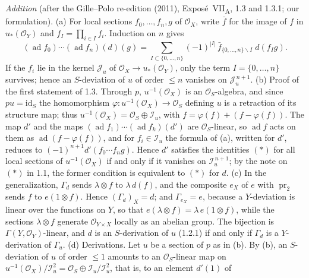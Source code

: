 \par\medskip\noindent{}%
\emph{Addition} (after the Gille--Polo re-edition (2011),
Expos\'e~VII\textsubscript{A}, 1.3 and 1.3.1; our formulation).
(a) For local sections \(f_0,\ldots,f_n,g\) of \(\mathcal O_X\), write
\(\bar f\) for the image of \(f\) in \(u_*(\mathcal O_Y)\) and
\(f_I=\prod_{i\in I}f_i\). Induction on \(n\) gives
\[
  (\operatorname{ad}f_0)\cdots(\operatorname{ad}f_n)(d)(g)
  =\sum_{I\subset\{0,\ldots,n\}}(-1)^{|I|}\,
   \bar f_{\{0,\ldots,n\}\smallsetminus I}\;d(f_Ig).
\]
If the \(f_i\) lie in the kernel \(\mathcal J_u\) of
\(\mathcal O_X\to u_*(\mathcal O_Y)\), only the term
\(I=\{0,\ldots,n\}\) survives; hence an \(S\)-deviation of \(u\) of
order \(\leq n\) vanishes on \(\mathcal J_u^{\,n+1}\).
(b) Proof of the first statement of 1.3. Through \(p\),
\(u^{-1}(\mathcal O_X)\) is an \(\mathcal O_S\)-algebra, and since
\(pu=\mathrm{id}_S\) the homomorphism
\(\varphi:u^{-1}(\mathcal O_X)\to\mathcal O_S\) defining \(u\) is a
retraction of its structure map; thus
\(u^{-1}(\mathcal O_X)=\mathcal O_S\oplus\mathcal I_u\), with
\(f=\varphi(f)+(f-\varphi(f))\). The map \(d'\) and the maps
\((\operatorname{ad}f_1)\cdots(\operatorname{ad}f_k)(d')\) are
\(\mathcal O_S\)-linear, so \(\operatorname{ad}f\) acts on them as
\(\operatorname{ad}(f-\varphi(f))\), and for \(f_i\in\mathcal I_u\) the
formula of (a), written for \(d'\), reduces to
\((-1)^{n+1}d'(f_0\cdots f_ng)\). Hence \(d'\) satisfies the identities
\((\ast)\) for all local sections of \(u^{-1}(\mathcal O_X)\) if and only
if it vanishes on \(\mathcal I_u^{\,n+1}\); by the note on \((\ast)\)
in 1.1, the former condition is equivalent to \((\ast)\) for \(d\).
(c) In the generalization, \(\Gamma_d\) sends \(\lambda\otimes f\) to
\(\lambda\,d(f)\), and the composite \(e_X\) of \(e\) with
\(\operatorname{pr}_2\) sends \(f\) to \(e(1\otimes f)\). Hence
\((\Gamma_d)_X=d\); and \(\Gamma_{e_X}=e\), because a \(Y\)-deviation is
linear over the functions on \(Y\), so that
\(e(\lambda\otimes f)=\lambda\,e(1\otimes f)\), while the sections
\(\lambda\otimes f\) generate \(\mathcal O_{Y\times X}\) locally as an
abelian group. The bijection is \(\Gamma(Y,\mathcal O_Y)\)-linear, and
\(d\) is an \(S\)-derivation of \(u\) (1.2.1) if and only if
\(\Gamma_d\) is a \(Y\)-derivation of \(\Gamma_u\).
(d) Derivations. Let \(u\) be a section of \(p\) as in (b). By (b), an
\(S\)-deviation of \(u\) of order \(\leq1\) amounts to an
\(\mathcal O_S\)-linear map on
\(u^{-1}(\mathcal O_X)/\mathcal I_u^2=\mathcal O_S\oplus
\mathcal I_u/\mathcal I_u^2\), that is, to an element \(d'(1)\) of
